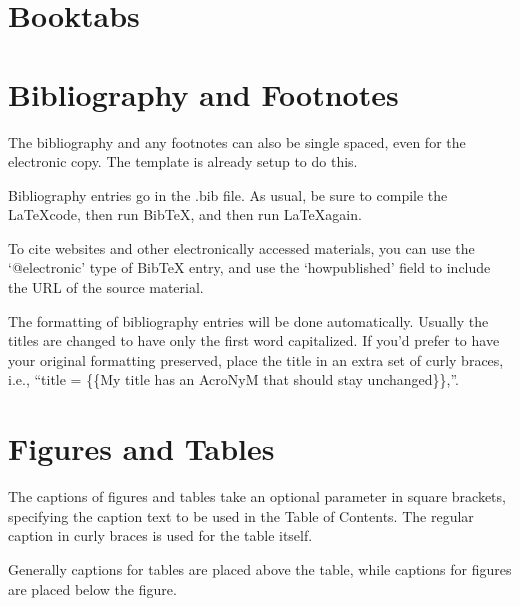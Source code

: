 \section{Booktabs}

\section{Bibliography and Footnotes}

The bibliography and any footnotes can also be single spaced, even for the electronic copy. The template is already setup to do this.

Bibliography entries go in the .bib file. As usual, be sure to compile the \LaTeX code, then run BibTeX, and then run \LaTeX again.

To cite websites and other electronically accessed materials, you can use the `@electronic' type of BibTeX entry, and use the `howpublished' field to include the URL of the source material.

The formatting of bibliography entries will be done automatically. Usually the titles are changed to have only the first word capitalized. If you'd prefer to have your original formatting preserved, place the title in an extra set of curly braces, i.e., ``title = \{\{My title has an AcroNyM that should stay unchanged\}\},''.

\section{Figures and Tables}
The captions of figures and tables take an optional parameter in square brackets, specifying the caption text to be used in the Table of Contents. The regular caption in curly braces is used for the table itself.

Generally captions for tables are placed above the table, while captions for figures are placed below the figure.



